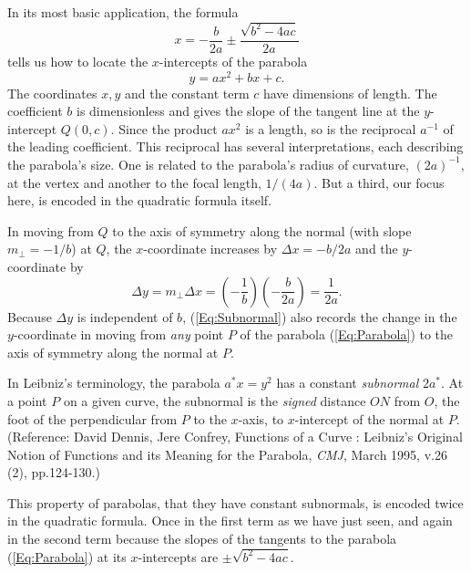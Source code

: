 \documentclass{ximera}
\begin{document}
In its most basic application, the formula
\[
   x = -\frac{b}{2a}\pm \frac{\sqrt{b^2-4ac}}{2a}
\]
tells us how to locate the $x$-intercepts of the parabola 
\begin{equation}
 y=ax^2+bx+c.   \label{Eq:Parabola}
 \end{equation}
 The coordinates $x,y$ and the constant term $c$ have dimensions of length. The coefficient $b$ is dimensionless and gives the slope of the tangent line at the $y$-intercept $Q(0,c)$. Since the product $ax^2$ is a length, so is the reciprocal $a^{-1}$ of the leading coefficient. This reciprocal has several interpretations, each describing the parabola's size. One is related to the parabola's radius of curvature, $(2a)^{-1}$, at the vertex and another to the focal length, $1/(4a)$. But a third, our focus here, is encoded in the quadratic formula itself.



In moving from $Q$ to the axis of symmetry along the normal (with slope $m_\perp = -1/b$) at $Q$, the $x$-coordinate increases by $\Delta x = -b/2a$ and the $y$-coordinate by
\begin{equation}
 \Delta y = m_\perp \Delta x = \left( -\frac{1}{b}\right) \left(- \frac{b}{2a}  \right)= \frac{1}{2a} .  \label{Eq:Subnormal}
\end{equation}
Because $\Delta y$ is independent of $b$, (\ref{Eq:Subnormal}) also records the change in the $y$-coordinate in moving from \emph{any} point $P$ of the parabola (\ref{Eq:Parabola}) to the axis of symmetry along the normal at $P$.

In Leibniz's terminology, the parabola $a^* x=y^2$ has a constant \emph{subnormal} $2a^*$. At a point $P$ on a given curve, the subnormal is the \emph{signed} distance $ON$ from $O$, the foot of the perpendicular from $P$ to the $x$-axis, to $x$-intercept of the normal at $P$. %
(Reference: David Dennis, Jere Confrey, Functions of a Curve :
Leibniz's Original Notion of Functions and its Meaning for the Parabola, \emph{CMJ}, March 1995, v.26 (2), pp.124-130.) 

This property of parabolas, that they have constant subnormals, is encoded twice in the quadratic formula. Once in the first term as we have just seen, and again in the second term because the slopes of the tangents to the parabola (\ref{Eq:Parabola}) at its $x$-intercepts are $\pm \sqrt{b^2-4ac}$. 
\end{document}
